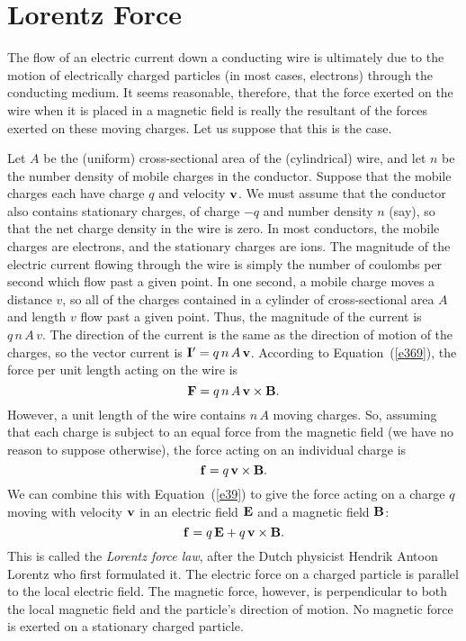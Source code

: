 \section{Lorentz Force}\label{slorentz}
The flow of an electric current down
a conducting  wire is ultimately due to  the motion of
electrically charged particles
(in most cases, electrons) through the conducting medium.
 It seems reasonable, therefore, that
the force exerted on the wire when it is placed in a magnetic field is really
the resultant of the  forces exerted on these moving charges. Let us
suppose that this is the case. 

Let $A$ be the 
(uniform) cross-sectional area of the (cylindrical) wire, and let $n$ be the number density
of mobile charges in the conductor. Suppose that the
mobile charges each have charge $q$ and velocity ${\bf v}$. We must assume that
the conductor also contains stationary charges, of charge $-q$ and number density
$n$ (say), so that the net charge density in the wire is zero. In most conductors, the
mobile charges are electrons, and the stationary charges are ions.
The magnitude of the electric current flowing through the wire is simply the
number of coulombs per second which flow past a given point. In one second,
a mobile charge moves a distance $v$, so all of the charges contained in a
cylinder of cross-sectional area $A$ and length $v$ flow past a given point.
Thus, the magnitude of the current is $q\,n\, A\,v$. The direction of the 
current is the same as the direction of motion of the charges, so the
vector current is ${\bf I}' = q\,n\,A\,{\bf v}$.
According to Equation~(\ref{e369}), the force per unit length acting on the wire is
\begin{equation}
{\bf F} = q\,n\, A \,{\bf v}\times{\bf B}.
\end{equation}
However, a unit length of the wire contains $n\,A$ moving charges. So, assuming
that each charge is subject to an equal force from the magnetic field (we have
no reason to suppose otherwise), the force acting on an individual charge is
\begin{equation}
{\bf f} = q\,{\bf v} \times{\bf B}.
\end{equation}
We can combine this with Equation~(\ref{e39}) to give the force acting on a charge $q$ moving
with velocity ${\bf v}$ in an electric field ${\bf E}$ and a magnetic field
${\bf B}$:
\begin{equation}\label{e374}
{\bf f} = q\,{\bf E} + q\,{\bf v} \times{\bf B}.
\end{equation}
This is called the {\em Lorentz force law}, after the Dutch physicist
Hendrik Antoon Lorentz who first formulated it. The electric
force on a charged particle is parallel to the local electric field.
The magnetic force, however, is perpendicular to both the local magnetic
field and the particle's direction of motion. No magnetic force is exerted on a
stationary charged particle.

